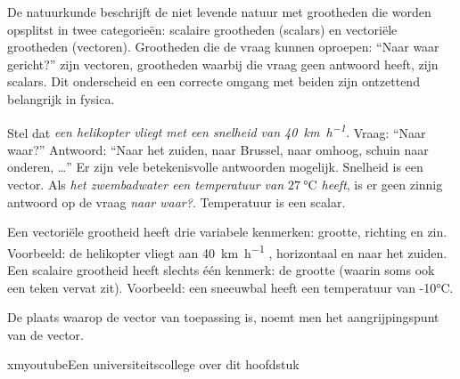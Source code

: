 \documentclass{ximera}
\begin{document}
	\author{Bart Lambregs}
    \xmsource\xmuitleg


De natuurkunde beschrijft de niet levende natuur met grootheden die worden opsplitst in twee categorieën: scalaire grootheden (scalars) en vectoriële grootheden (vectoren). 
Grootheden die de vraag kunnen oproepen: “Naar waar gericht?” zijn vectoren, grootheden waarbij die vraag geen antwoord heeft, zijn scalars. 
Dit onderscheid en een correcte omgang met beiden zijn ontzettend belangrijk in fysica.


Stel dat \textit{een helikopter vliegt met een snelheid van \SI{40}{\kilo\meter\per\hour}.} 
Vraag: “Naar waar?” Antwoord: “Naar het zuiden, naar Brussel, naar omhoog, schuin naar onderen, …” 
Er zijn vele betekenisvolle antwoorden mogelijk. 
Snelheid is een vector. 
Als \textit{het zwembadwater een temperatuur van  \(\SI{27}{\celsius}\) heeft}, is er geen zinnig antwoord op de vraag \textit{naar waar?}. 
Temperatuur is een scalar.



Een vectoriële grootheid heeft drie variabele kenmerken: grootte, richting en zin. Voorbeeld: de helikopter vliegt aan \SI{40}{\kilo\meter\per\hour} , horizontaal en naar het zuiden. 
Een scalaire grootheid heeft slechts één kenmerk: de grootte (waarin soms ook een teken vervat zit). 
Voorbeeld: een sneeuwbal heeft een temperatuur van -10°C.

De plaats waarop de vector van toepassing is, noemt men het aangrijpingspunt van de vector.



\begin{expandable}{xmyoutube}{Een universiteitscollege over dit hoofdstuk}
\end{expandable}





	
\end{document}
